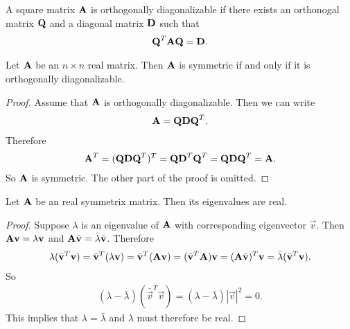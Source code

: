 \documentclass{memoir}
\begin{document}
\begin{definition}
    A square matrix $\boldsymbol{\mathbf{A}}$ is orthogonally diagonalizable if there exists an orthonogal matrix $\boldsymbol{\mathbf{Q}}$ and a diagonal matrix $\boldsymbol{\mathbf{D}}$ such that
    \begin{align*}
        \boldsymbol{\mathbf{Q}}^T \boldsymbol{\mathbf{A}} \boldsymbol{\mathbf{Q}} = \boldsymbol{\mathbf{D}}.
    \end{align*}
\end{definition}

\begin{theorem}
    Let $\boldsymbol{\mathbf{A}}$ be an $n \times n$ real matrix. Then $\boldsymbol{\mathbf{A}}$ is symmetric if and only if it is orthogonally diagonalizable.
\end{theorem}
\begin{proof}
    Assume that $\boldsymbol{\mathbf{A}}$ is orthogonally diagonalizable. Then we can write
    \begin{align*}
        \boldsymbol{\mathbf{A}} = \boldsymbol{\mathbf{Q}} \boldsymbol{\mathbf{D}} \boldsymbol{\mathbf{Q}}^T.
    \end{align*}
    Therefore
    \begin{align*}
        \boldsymbol{\mathbf{A}}^T = (\boldsymbol{\mathbf{Q}} \boldsymbol{\mathbf{D}} \boldsymbol{\mathbf{Q}}^T)^T = \boldsymbol{\mathbf{Q}} \boldsymbol{\mathbf{D}}^T \boldsymbol{\mathbf{Q}}^T = \boldsymbol{\mathbf{Q}} \boldsymbol{\mathbf{D}} \boldsymbol{\mathbf{Q}}^T = \boldsymbol{\mathbf{A}}.
    \end{align*}
    So $\boldsymbol{\mathbf{A}}$ is symmetric. The other part of the proof is omitted.
\end{proof}

\begin{theorem}
    Let $\boldsymbol{\mathbf{A}}$ be an real symmetrix matrix. Then its eigenvalues are real.
\end{theorem}
\begin{proof}
    Suppose $\lambda$ is an eigenvalue of $\boldsymbol{\mathbf{A}}$ with corresponding eigenvector $\vec{v}$. Then $\boldsymbol{\mathbf{A}} \boldsymbol{\mathbf{v}} = \lambda \boldsymbol{\mathbf{v}}$ and $\boldsymbol{\mathbf{A}} \bar{\boldsymbol{\mathbf{v}}} = \bar{\lambda} \bar{\boldsymbol{\mathbf{v}}}$. Therefore
    \begin{align*}
        \lambda (\bar{\boldsymbol{\mathbf{v}}}^T \boldsymbol{\mathbf{v}}) = \bar{\boldsymbol{\mathbf{v}}}^T (\lambda \boldsymbol{\mathbf{v}}) = \bar{\boldsymbol{\mathbf{v}}}^T (\boldsymbol{\mathbf{A}} \boldsymbol{\mathbf{v}}) = (\bar{\boldsymbol{\mathbf{v}}}^T \boldsymbol{\mathbf{A}}) \boldsymbol{\mathbf{v}} = (\boldsymbol{\mathbf{A}} \bar{\boldsymbol{\mathbf{v}}})^T \boldsymbol{\mathbf{v}} = \bar{\lambda} (\bar{\boldsymbol{\mathbf{v}}}^T \boldsymbol{\mathbf{v}}).
    \end{align*}
    So
    \begin{align*}
        (\lambda - \bar{\lambda})(\bar{\vec{v}}^T \vec{v}) = (\lambda - \bar{\lambda}) |\vec{v}|^2 = 0.
    \end{align*}
    This implies that $\lambda = \bar{\lambda}$ and $\lambda$ must therefore be real.
\end{proof}
\end{document}
